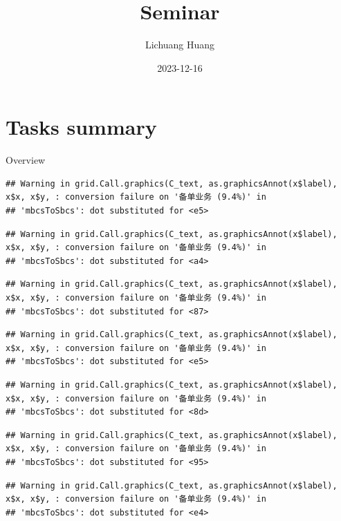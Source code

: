 \documentclass[
  5pt,
  ignorenonframetext,
]{beamer}
\title{Seminar}
\author{Lichuang Huang}
\date{2023-12-16}
\institute{Wie-Biotech}
\begin{document}
\frame{\titlepage}

\hypertarget{tasks-summary}{%
\section{Tasks summary}\label{tasks-summary}}

\begin{frame}[fragile]{Overview}
\protect\hypertarget{overview}{}
\begin{verbatim}
## Warning in grid.Call.graphics(C_text, as.graphicsAnnot(x$label), x$x, x$y, : conversion failure on '备单业务 (9.4%)' in
## 'mbcsToSbcs': dot substituted for <e5>
\end{verbatim}

\begin{verbatim}
## Warning in grid.Call.graphics(C_text, as.graphicsAnnot(x$label), x$x, x$y, : conversion failure on '备单业务 (9.4%)' in
## 'mbcsToSbcs': dot substituted for <a4>
\end{verbatim}

\begin{verbatim}
## Warning in grid.Call.graphics(C_text, as.graphicsAnnot(x$label), x$x, x$y, : conversion failure on '备单业务 (9.4%)' in
## 'mbcsToSbcs': dot substituted for <87>
\end{verbatim}

\begin{verbatim}
## Warning in grid.Call.graphics(C_text, as.graphicsAnnot(x$label), x$x, x$y, : conversion failure on '备单业务 (9.4%)' in
## 'mbcsToSbcs': dot substituted for <e5>
\end{verbatim}

\begin{verbatim}
## Warning in grid.Call.graphics(C_text, as.graphicsAnnot(x$label), x$x, x$y, : conversion failure on '备单业务 (9.4%)' in
## 'mbcsToSbcs': dot substituted for <8d>
\end{verbatim}

\begin{verbatim}
## Warning in grid.Call.graphics(C_text, as.graphicsAnnot(x$label), x$x, x$y, : conversion failure on '备单业务 (9.4%)' in
## 'mbcsToSbcs': dot substituted for <95>
\end{verbatim}

\begin{verbatim}
## Warning in grid.Call.graphics(C_text, as.graphicsAnnot(x$label), x$x, x$y, : conversion failure on '备单业务 (9.4%)' in
## 'mbcsToSbcs': dot substituted for <e4>
\end{verbatim}


\end{frame}
\end{document}
